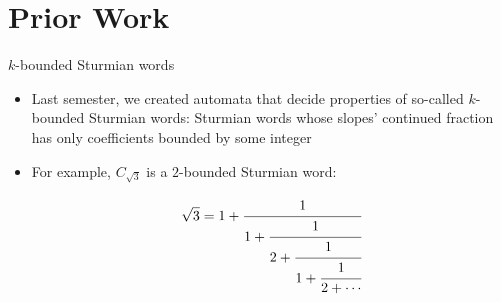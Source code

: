 \documentclass[leqno,presentation]{beamer}
\begin{document}

\section{Prior Work}

\begin{frame}{$k$-bounded Sturmian words}
    \begin{itemize}
        \item Last semester, we created automata that decide properties of so-called $k$-bounded Sturmian words: Sturmian words whose slopes' continued fraction has only coefficients bounded by some integer
        
        \item For example, $C_{\sqrt{3}}$ is a $2$-bounded Sturmian word:
        
        \[
            \sqrt{3} = 1 + \cfrac{1}{1 + \cfrac{1}{2 + \cfrac{1}{1 + \cfrac{1}{2 + \cdots}}}}
        \]

    \end{itemize}
\end{frame}
\end{document}
